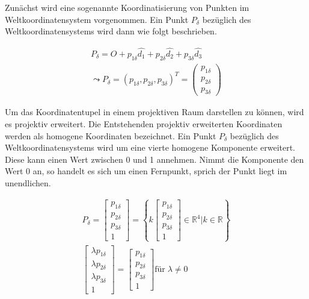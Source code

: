 	
Zunächst wird eine sogenannte Koordinatisierung von Punkten im Weltkoordinatensystem vorgenommen. Ein Punkt $P_\delta$ bezüglich des Weltkoordinatensystems wird dann wie folgt beschrieben.

	
	\begin{gather}
	P_\delta = O + p_{1\delta}\hat{d_1} + p_{2\delta}\hat{d_2} + p_{3\delta}\hat{d_3}\\
	\leadsto P_\delta = (p_{1\delta},p_{2\delta},p_{3\delta})^T = \begin{pmatrix} p_{1\delta} \\ p_{2\delta} \\ p_{3\delta} \end{pmatrix}
	\end{gather}
	
Um das Koordinatentupel in einem projektiven Raum darstellen zu können, wird es projektiv erweitert. Die Entstehenden projektiv erweiterten Koordinaten werden als homogene Koordinaten bezeichnet. Ein Punkt $P_\delta$ bezüglich des Weltkoordinatensystems wird um eine vierte homogene Komponente erweitert. Diese kann einen Wert zwischen 0 und 1 annehmen. Nimmt die Komponente den Wert 0 an, so handelt es sich um einen Fernpunkt, sprich der Punkt liegt im unendlichen.
	
	\begin{gather}
	P_\delta = \begin{bmatrix} p_{1\delta} \\ p_{2\delta} \\ p_{3\delta} \\1 \end{bmatrix} = \left\{ k \begin{bmatrix} p_{1\delta}\\p_{2\delta}\\p_{3\delta}\\1 \end{bmatrix} \in \mathbb{R} ^4 |  k \in \mathbb{R}\right\}\\
	\begin{bmatrix}\lambda p_{1\delta}\\ \lambda p_{2\delta} \\ \lambda p_{3\delta} \\ 1 \end{bmatrix} = \begin{bmatrix}p_{1\delta} \\ p_{2\delta} \\ p_{3\delta} \\ 1\end{bmatrix} \text{für} \; \lambda \ne 0
	\end{gather}


